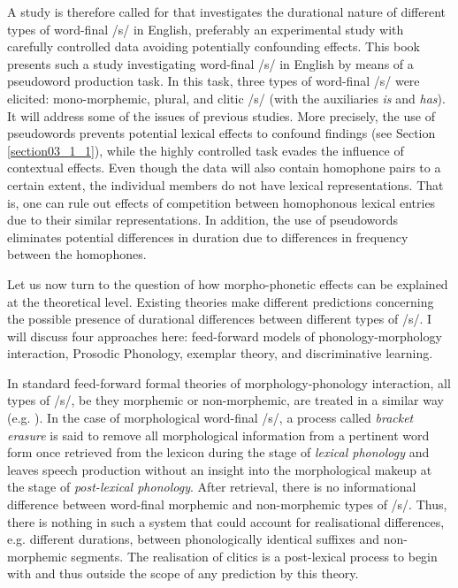 A study is therefore called for that investigates the durational nature of different types of word-final /s/ in English, preferably an experimental study with carefully controlled data avoiding potentially confounding effects. This book presents such a study investigating word-final /s/ in English by means of a pseudoword production task. In this task, three types of word-final /s/ were elicited: mono-morphemic, plural, and clitic /s/ (with the auxiliaries \textit{is} and \textit{has}). It will address some of the issues of previous studies. More precisely, the use of pseudowords prevents potential lexical effects to confound findings (see Section \ref{section03_1_1}), while the highly controlled task evades the influence of contextual effects. Even though the data will also contain homophone pairs to a certain extent, the individual members do not have lexical representations. That is, one can rule out effects of competition between homophonous lexical entries due to their similar representations. In addition, the use of pseudowords eliminates potential differences in duration due to differences in frequency between the homophones.

Let us now turn to the question of how morpho-phonetic effects can be explained at the theoretical level. Existing theories make different predictions concerning the possible presence of durational differences between different types of /s/. I will discuss four approaches here: feed-forward models of phonology-morphology interaction, Prosodic Phonology, exemplar theory, and discriminative learning. 

In standard feed-forward formal theories of morphology-phonology interaction, all types of /s/, be they morphemic or non-morphemic, are treated in a similar way (e.g. \cite{Chomsky1968,Kiparsky1982}). In the case of morphological word-final /s/, a process called \textit{bracket erasure} is said to remove all morphological information from a pertinent word form once retrieved from the lexicon during the stage of \textit{lexical phonology} and leaves speech production without an insight into the morphological makeup at the stage of \textit{post-lexical phonology}. After retrieval, there is no informational difference between word-final morphemic and non-morphemic types of /s/. Thus, there is nothing in such a system that could account for realisational differences, e.g. different durations, between phonologically identical suffixes and non-morphemic segments. The realisation of clitics is a post-lexical process to begin with and thus outside the scope of any prediction by this theory.

